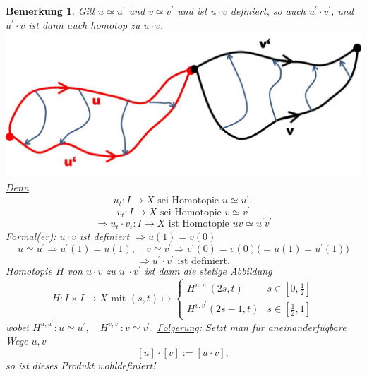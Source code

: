 \documentclass[a4paper,11pt,notitlepage]{report}
\newtheorem{remark}{Bemerkung}[chapter]
\begin{document}
\begin{remark}{}
	Gilt $u \simeq u^\prime$ und $v \simeq v^\prime$ und ist $u \cdot v$ definiert, so auch $u^\prime \cdot v^\prime$, und $u^\prime \cdot v$ ist dann auch homotop zu $u \cdot v$.
	\newline \includegraphics[scale=0.4]{images/Homotopie_Produkt.jpg}
	\newline
	\underline{Denn}
	$$u_t \colon I \rightarrow X \text{ sei Homotopie } u \simeq u^\prime,$$
	$$v_t \colon I \rightarrow X \text{ sei Homotopie } v \simeq v^\prime$$
	$$\Rightarrow u_t \cdot v_t \colon I \rightarrow X \text{ ist Homotopie } uv \simeq u^\prime v^\prime$$
	\underline{Formal(er)}: $u \cdot v$ ist definiert $\Rightarrow u(1) = v(0)$
	$$u \simeq u^\prime \Rightarrow u^\prime(1)=u(1), \quad v \simeq v^\prime \Rightarrow v^\prime(0) = v(0)  \big(=u(1)=u^\prime(1)\big)$$
	$$\Rightarrow u^\prime \cdot v^\prime \text{ ist definiert.}$$
	Homotopie $H$ von $u \cdot v$ zu $u^\prime \cdot v^\prime$ ist dann die stetige Abbildung
	$$H \colon I \times I \rightarrow X \text{ mit } (s,t) \mapsto \begin{cases} H^{u,u^\prime}(2s,t) & s \in [0,\frac{1}{2}] \\ H^{v,v^\prime}(2s-1,t) & s \in [\frac{1}{2},1] \end{cases}$$
	wobei $H^{u,u^\prime} \colon u \simeq u^\prime, \quad H^{v,v^\prime} \colon v \simeq v^\prime$.
	\newline
	\underline{Folgerung}: Setzt man für aneinanderfügbare Wege $u,v$
	$$[u] \cdot [v] := [u \cdot v],$$
	so ist dieses Produkt wohldefiniert!
\end{remark}
\end{document}
